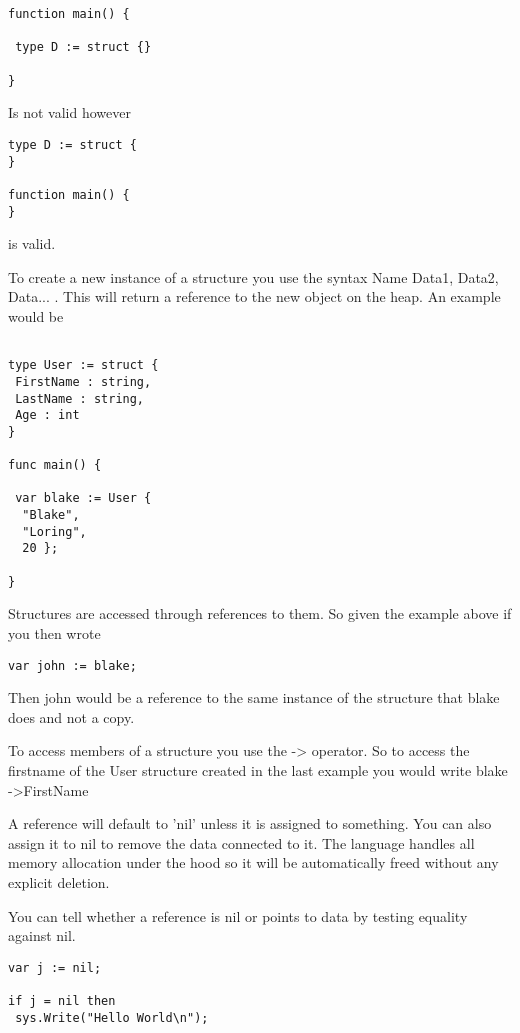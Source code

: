 \documentclass[]{final_report}
\begin{document}
\begin{verbatim}
function main() {

 type D := struct {}

}
\end{verbatim}

Is not valid however

\begin{verbatim}
type D := struct {
}

function main() {
}
\end{verbatim}

is valid.

To create a new instance of a structure you use the syntax Name{ Data1, Data2, Data... }. This will return a reference to the new object on the heap. An example would be

\begin{verbatim}

type User := struct {
 FirstName : string,
 LastName : string,
 Age : int
}

func main() {
 
 var blake := User {
  "Blake",
  "Loring", 
  20 };

}
\end{verbatim}

Structures are accessed through references to them. So given the example above if you then wrote

\begin{verbatim}
var john := blake;
\end{verbatim}

Then john would be a reference to the same instance of the structure that blake does and not a copy. 

To access members of a structure you use the -\textgreater \vspace{1pt} operator. So to access the firstname of the User structure created in the last example you would write blake -\textgreater FirstName 

A reference will default to 'nil' unless it is assigned to something. You can also assign it to nil to remove the data connected to it. The language handles all memory allocation under the hood so it will be automatically freed without any explicit deletion.

You can tell whether a reference is nil or points to data by testing equality against nil.

\begin{verbatim}
var j := nil; 

if j = nil then 
 sys.Write("Hello World\n");
\end{verbatim}
\end{document}

